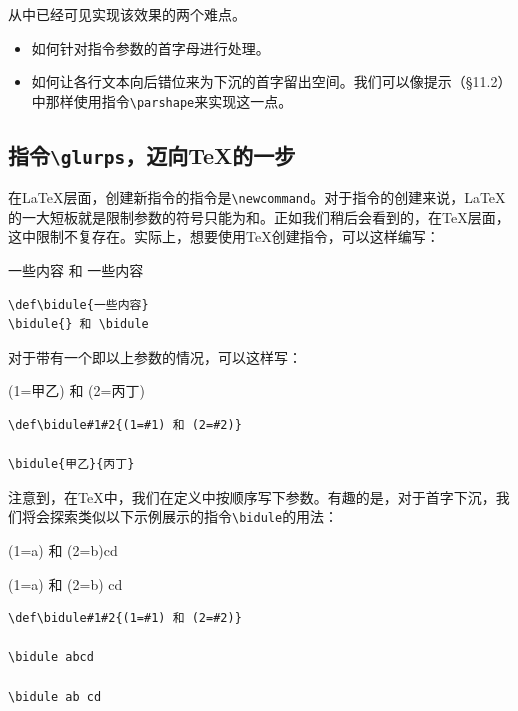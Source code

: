 从中已经可见实现该效果的两个难点。

\begin{itemize}
    \item 如何针对指令参数的首字母进行处理。
    \item 如何让各行文本向后错位来为下沉的首字留出空间。我们可以像提示（\S 11.2）中那样使用指令\verb|\parshape|来实现这一点。
\end{itemize}

\subsection{指令\texttt{\backslash glurps}，迈向\TeX 的一步}

在\LaTeX 层面，创建新指令的指令是\verb|\newcommand|。对于指令的创建来说，\LaTeX 的一大短板就是限制参数的符号只能为\dm{\{}和\dm{\}}。正如我们稍后会看到的，在\TeX 层面，这中限制不复存在。实际上，想要使用\TeX 创建指令，可以这样编写：

\begin{codelist}[11.17]{
\def\bidule{一些内容}
\bidule{} 和 \bidule
}
\begin{verbatim}
\def\bidule{一些内容}
\bidule{} 和 \bidule\end{verbatim}
\end{codelist}

对于带有一个即以上参数的情况，可以这样写：

\begin{codelist}[11.18]{
    \def\bidule#1#2{(1=#1) 和 (2=#2)}

    \bidule{甲乙}{丙丁}
}
\begin{verbatim}
\def\bidule#1#2{(1=#1) 和 (2=#2)}

\bidule{甲乙}{丙丁}\end{verbatim}
\end{codelist}

注意到，在\TeX 中，我们在定义中按顺序写下参数。有趣的是，对于首字下沉，我们将会探索类似以下示例展示的指令\verb|\bidule|的用法：

\begin{codelist}[11.19]{
    \def\bidule#1#2{(1=#1) 和 (2=#2)}

\bidule abcd

\bidule ab cd
}
\begin{verbatim}
\def\bidule#1#2{(1=#1) 和 (2=#2)}

\bidule abcd

\bidule ab cd\end{verbatim}
\end{codelist}

